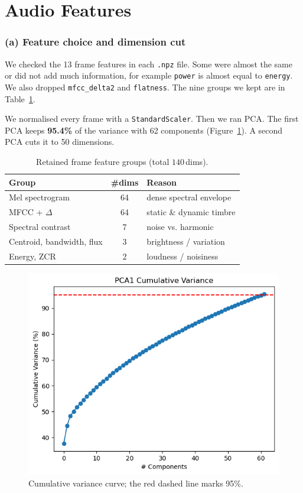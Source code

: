 \documentclass{article}
\begin{document}
\maketitle


\section{Audio Features}

\subsubsection{(a) Feature choice and dimension cut}
We checked the 13 frame features in each \texttt{.npz} file. Some were almost the same or did not add much information, for example \texttt{power} is almost equal to \texttt{energy}. We also dropped \texttt{mfcc\_delta2} and \texttt{flatness}. The nine groups we kept are in Table~\ref{tab:feat}.

We normalised every frame with a \texttt{StandardScaler}. Then we ran PCA. The first PCA keeps \textbf{95.4\%} of the variance with 62 components (Figure~\ref{fig:pca}). A second PCA cuts it to 50 dimensions.

\begin{table}[h]
    \caption{Retained frame feature groups (total $140$\,dims).}
    \label{tab:feat}
    \centering
    \begin{tabular}{lcl}
        \toprule
        Group & \#dims & Reason \\ \midrule
        Mel spectrogram            & 64 & dense spectral envelope \\
        MFCC + $\Delta$            & 64 & static \& dynamic timbre \\
        Spectral contrast          & 7  & noise vs. harmonic      \\
        Centroid, bandwidth, flux  & 3  & brightness / variation   \\
        Energy, ZCR                & 2  & loudness / noisiness     \\ \bottomrule
    \end{tabular}
\end{table}

\begin{figure}[h]
    \centering
    \includegraphics[width=.55\linewidth]{figs_tang/03_pca_cumulative_variance.png}
    \caption{Cumulative variance curve; the red dashed line marks 95\%.}
    \label{fig:pca}
\end{figure}
\end{document}
